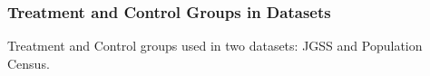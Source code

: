 \documentclass[serif, aspectratio=169]{beamer}
\begin{document}
\begin{frame}[label=treatment_control_groups]
\frametitle{Treatment and Control Groups in Datasets}







Treatment and Control groups used in two datasets: JGSS and Population Census.

\begin{table}[htbp]
\centering
\caption{JGSS Descriptive Statistics Analysis (analyzed by gender)}


\end{table}
\end{frame}
\end{document}
